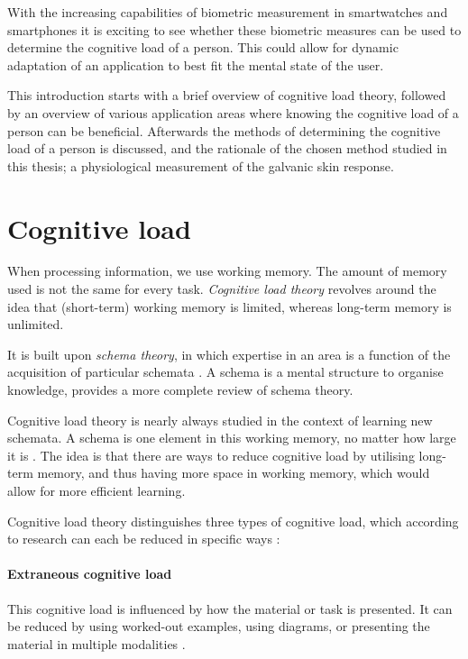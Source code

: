 \documentclass[11pt,leqno,a4paper]{report} %
\begin{document}
With the increasing capabilities of biometric measurement in smartwatches and smartphones it is exciting to see whether these biometric measures can be used to determine the cognitive load of a person. This could allow for dynamic adaptation of an application to best fit the mental state of the user.

This introduction starts with a brief overview of cognitive load theory, followed by an overview of various application areas where knowing the cognitive load of a person can be beneficial. Afterwards the methods of determining the cognitive load of a person is discussed, and the rationale of the chosen method studied in this thesis; a physiological measurement of the galvanic skin response.

\section{Cognitive load}
When processing information, we use working memory. The amount of memory used is not the same for every task. \emph{Cognitive load theory} \citep{Oviatt2004} revolves around the idea that (short-term) working memory is limited, whereas long-term memory is unlimited. 

It is built upon \emph{schema theory}, in which expertise in an area is a function of the acquisition of particular schemata \citep{bartlett1995remembering}. A schema is a mental structure to organise knowledge, \citep{mcvee2005schema} provides a more complete review of schema theory.

Cognitive load theory is nearly always studied in the context of learning new schemata. A schema is one element in this working memory, no matter how large it is \citep{mayer2014cambridge}. The idea is that there are ways to reduce cognitive load by utilising long-term memory, and thus having more space in working memory, which would allow for more efficient learning.

Cognitive load theory distinguishes three types of cognitive load, which according to research can each be reduced in specific ways \citep{mayer2002multimedia}:


\paragraph{Extraneous cognitive load}
This cognitive load is influenced by how the material or task is presented. It can be reduced by using worked-out examples, using diagrams, or presenting the material in multiple modalities \citep{mousavi1995reducing}.
\end{document}

